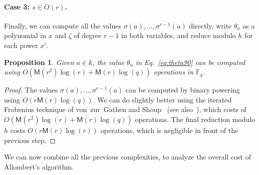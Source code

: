 \documentclass[12pt]{article}
\theoremstyle{plain}
\newtheorem{proposition}[theorem]{Proposition}
\theoremstyle{definition}
\def\F{\ensuremath{\mathbb{F}}}
\def\MM{\ensuremath{\mathsf{M}}}
\newcounter{algorithm}
\begin{document}
\paragraph{Case 3: $s\in O(r)$.}
Finally, we can compute all the values
$\sigma(a),\dots,\sigma^{r-1}(a)$ directly, write $\theta_a$ as a
polynomial in $x$ and $\zeta$ of degree $r-1$ in both variables, and
reduce modulo $h$ for each power $x^i$.

\begin{proposition}
  \label{prop:iter-frob-theta}
  Given $a\in k$, the value $\theta_a$ in Eq.~\eqref{eq:theta90} can
  be computed using $O(\MM(r^2)\log(r) + \MM(r)\log(q))$ operations in
  $\F_q$.
\end{proposition}
\begin{proof}
  The values $\sigma(a),\dots,\sigma^{r-1}(a)$ can be computed by
  binary powering using $O(r\MM(r)\log(q))$. %
  We can do slightly better using the iterated Frobenius technique of
  von~zur~Gathen and Shoup~\cite[Algorithm~3.1]{von1992computing} (see
  also~\cite[Ch.~14.7]{vzGG}), which costs of
  $O(\MM(r^2)\log(r) + \MM(r)\log(q))$ operations. %
  The final reduction modulo $h$ costs $O(r\MM(r)\log(r))$ operations,
  which is negligible in front of the previous step.
\end{proof}

We can now combine all the previous complexities, to analyze the
overall cost of Allombert's algorithm.
\end{document}
